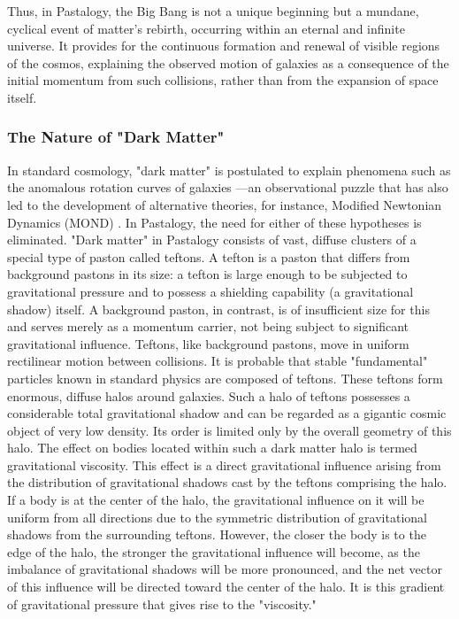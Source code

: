 \documentclass[pdflatex,sn-mathphys-num,referee]{sn-jnl}
\begin{document}
Thus, in Pastalogy, the Big Bang is not a unique beginning but a mundane, cyclical event of matter's rebirth, occurring within an eternal and infinite universe. It provides for the continuous formation and renewal of visible regions of the cosmos, explaining the observed motion of galaxies as a consequence of the initial momentum from such collisions, rather than from the expansion of space itself.

\subsubsection{The Nature of "Dark Matter"}\label{subsubsec:dark-matter}

In standard cosmology, "dark matter" is postulated to explain phenomena such as the anomalous rotation curves of galaxies \cite{rubin1980}---an observational puzzle that has also led to the development of alternative theories, for instance, Modified Newtonian Dynamics (MOND) \cite{milgrom1983-mond}. In Pastalogy, the need for either of these hypotheses is eliminated.
"Dark matter" in Pastalogy consists of vast, diffuse clusters of a special type of paston called teftons. A tefton is a paston that differs from background pastons in its size: a tefton is large enough to be subjected to gravitational pressure and to possess a shielding capability (a gravitational shadow) itself. A background paston, in contrast, is of insufficient size for this and serves merely as a momentum carrier, not being subject to significant gravitational influence. Teftons, like background pastons, move in uniform rectilinear motion between collisions. It is probable that stable "fundamental" particles known in standard physics are composed of teftons.
These teftons form enormous, diffuse halos around galaxies. Such a halo of teftons possesses a considerable total gravitational shadow and can be regarded as a gigantic cosmic object of very low density. Its order is limited only by the overall geometry of this halo.
The effect on bodies located within such a dark matter halo is termed gravitational viscosity. This effect is a direct gravitational influence arising from the distribution of gravitational shadows cast by the teftons comprising the halo. If a body is at the center of the halo, the gravitational influence on it will be uniform from all directions due to the symmetric distribution of gravitational shadows from the surrounding teftons. However, the closer the body is to the edge of the halo, the stronger the gravitational influence will become, as the imbalance of gravitational shadows will be more pronounced, and the net vector of this influence will be directed toward the center of the halo. It is this gradient of gravitational pressure that gives rise to the "viscosity."
\end{document}
